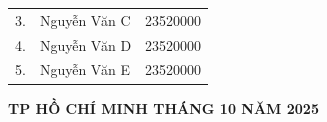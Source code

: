 \documentclass[../main.tex]{subfiles}
\begin{document}
\begin{titlepage}
\begin{center}
\begin{tabular}{c l c}
        3. & Nguyễn Văn C & 23520000\\
       
        4. & Nguyễn Văn D & 23520000\\
   
        5. & Nguyễn Văn E & 23520000\\
     
    \end{tabular}
    \end{center}
    
    \vfill
    
    {\large\textbf{TP HỒ CHÍ MINH THÁNG 10 NĂM 2025}}
    
\end{titlepage}
\end{document}
